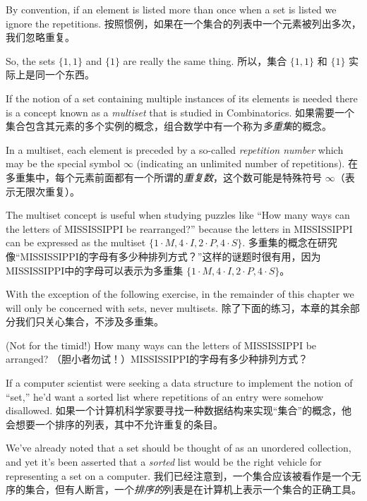 By
convention, if an element is listed more than once when a set is
listed  we ignore the repetitions.
按照惯例，如果在一个集合的列表中一个元素被列出多次，我们忽略重复。

So, the sets
$\{ 1, 1\}$ and $\{1\}$ are really the same thing.
所以，集合 $\{ 1, 1\}$ 和 $\{1\}$ 实际上是同一个东西。

If the notion
of a set containing multiple instances of its elements is needed there
is a concept known as a 
\emph{multiset} that is studied in Combinatorics.
如果需要一个集合包含其元素的多个实例的概念，组合数学中有一个称为\emph{多重集}的概念。

In a multiset, each element is preceded by a so-called 
\emph{repetition number}
which may be the special symbol $\infty$ (indicating an unlimited number
of repetitions).
在多重集中，每个元素前面都有一个所谓的\emph{重复数}，这个数可能是特殊符号 $\infty$（表示无限次重复）。

The multiset concept is useful when studying puzzles like
``How many ways can the letters of MISSISSIPPI be rearranged?'' because the
letters in MISSISSIPPI can be expressed as the multiset $\{1\cdot M, 4\cdot I,
2\cdot P, 4\cdot S \}$.
多重集的概念在研究像“MISSISSIPPI的字母有多少种排列方式？”这样的谜题时很有用，因为MISSISSIPPI中的字母可以表示为多重集 $\{1\cdot M, 4\cdot I, 2\cdot P, 4\cdot S \}$。

With the exception of the following exercise, in the
remainder of this chapter we will only be concerned with sets, never multisets.
除了下面的练习，本章的其余部分我们只关心集合，不涉及多重集。
\begin{exer}
(Not for the timid!) How many ways can the letters of MISSISSIPPI be arranged?
（胆小者勿试！）MISSISSIPPI的字母有多少种排列方式？
\end{exer}

If a computer scientist were seeking a data structure to implement the
notion of ``set,'' he'd want a sorted list where repetitions of an entry
were somehow disallowed.
如果一个计算机科学家要寻找一种数据结构来实现“集合”的概念，他会想要一个排序的列表，其中不允许重复的条目。

We've already noted that a set should be thought of
as an unordered collection, and yet it's been asserted that a \emph{sorted}
list would be the right vehicle for representing a set on a computer.
我们已经注意到，一个集合应该被看作是一个无序的集合，但有人断言，一个\emph{排序的}列表是在计算机上表示一个集合的正确工具。

